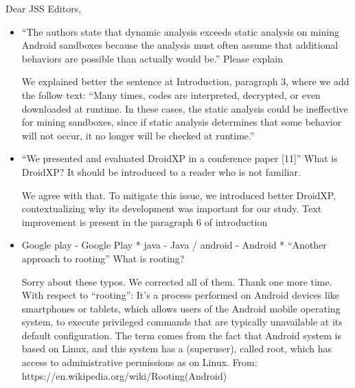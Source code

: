 \documentclass[12pt,english]{scrlttr2}
\begin{document}
\begin{letter}{Dear JSS Editors,}
\begin{itemize}
\vspace{0.2cm}

\item ``The authors state that dynamic analysis exceeds static analysis on mining Android sandboxes because the
analysis must often assume that additional behaviors are possible than actually would be.''
Please explain


\vspace{0.2cm}

{\color{blue}{\bf Answer.} We explained better the sentence at Introduction, paragraph 3, where we add the follow text: ``Many times, codes are interpreted, decrypted, or even downloaded at runtime. In these cases, the static analysis could be ineffective for mining sandboxes, since if static analysis determines that some behavior will not occur, it no longer will be checked at runtime.''}

\vspace{0.2cm}

\item ``We presented and evaluated DroidXP in a conference paper [11]''
What is DroidXP? It should be introduced to a reader who is not familiar.


\vspace{0.2cm}

{\color{blue}{\bf Answer.} We agree with that. To mitigate this issue, we introduced better DroidXP, contextualizing why its development was important for our study. Text improvement is present in the paragraph 6 of introduction}

\vspace{0.2cm}

\item Google play - Google Play
* java - Java / android - Android
* ``Another approach to rooting''
What is rooting?


\vspace{0.2cm}

{\color{blue}{\bf Answer.} Sorry about these typos. We corrected all of them. Thank one more time. With respect to ``rooting'': It's a process performed on Android devices like smartphones or tablets, which allows users of the Android mobile operating system, to execute privileged commands that are typically unavailable at its default configuration. The term comes from the fact that Android system is based on Linux, and this system has a (superuser), called root, which has access to administrative permissions as on Linux.\newline
From: https://en.wikipedia.org/wiki/Rooting(Android)
}


\end{itemize}
\end{letter}
\end{document}
